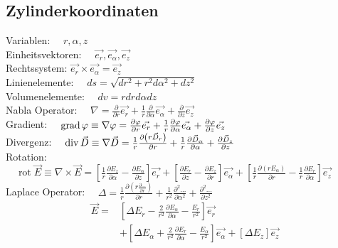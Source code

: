 \subsection{Zylinderkoordinaten}
Variablen:          $\quad r, \alpha, z$\\
Einheitsvektoren:   $\quad \vec{e_{r}}, \vec{e_{\alpha}}, \vec{e_{z}} \quad$\\
Rechtssystem: $\vec{e_{r}} \times \vec{e_{\alpha}}=\vec{e_{z}}$\\
Linienelemente:     $\quad d s=\sqrt{d r^{2}+r^{2} d \alpha^{2}+d z^{2}}$\\
Volumenelemente:    $\quad d v=r d r d \alpha d z$\\
Nabla Operator:     $\quad \nabla=\frac{\partial}{\partial r} \vec{e_{r}}+\frac{1}{r} \frac{\partial}{\partial \alpha} \vec{e_{\alpha}}+\frac{\partial}{\partial z} \vec{e_{z}}$\\
Gradient:           $\quad \operatorname{grad} \varphi \equiv \nabla \varphi=\frac{\partial \varphi}{\partial r} \vec{e_{r}}+\frac{1}{r} \frac{\partial \varphi}{\partial \alpha} \vec{e_{\alpha}}+\frac{\partial \varphi}{\partial z} \vec{e_{z}}$\\
Divergenz:          $\quad \operatorname{div} \vec{D} \equiv \nabla \vec{D}=\frac{1}{r} \frac{\partial\left(r \vec{D}_{r}\right)}{\partial r}+\frac{1}{r} \frac{\partial \vec{D}_{\alpha}}{\partial \alpha}+\frac{\partial \vec{D}_{z}}{\partial z}$\\
Rotation:           $\quad \operatorname{rot} \vec{E} \equiv \nabla \times \vec{E}=\left[\frac{1}{r} \frac{\partial E_{z}}{\partial \alpha}-\frac{\partial E_{\alpha}}{\partial z}\right] \vec{e_{r}}+\left[\frac{\partial E_{r}}{\partial z}-\frac{\partial E_{z}}{\partial r}\right] \vec{e_{\alpha}}+\left[\frac{1}{r} \frac{\partial\left(r E_{\alpha}\right)}{\partial r}-\frac{1}{r} \frac{\partial E_{r}}{\partial \alpha}\right] \vec{e_{z}}$\\
Laplace Operator:   $\quad \Delta = \frac{1}{r}\frac{\partial \left(r \frac{\partial \ldots}{\partial r}\right)}{\partial r} + \frac{1}{r^2}\frac{\partial^2 \ldots}{\partial \alpha^2} + \frac{\partial^2 \ldots}{\partial z^2}$\\
\begin{align*}
    \vec{E} = & \left[\Delta E_{r}-\frac{2}{r^{2}} \frac{\partial E_{\alpha}}{\partial \alpha}-\frac{E_{r}}{r^{2}}\right] \vec{e_{r}}                                                  \\
              & +\left[\Delta E_{\alpha}+\frac{2}{r^{2}} \frac{\partial E_{r}}{\partial \alpha}-\frac{E_{\alpha}}{r^{2}}\right] \vec{e_{\alpha}}+\left[\Delta E_{z}\right] \vec{e_{z}}
\end{align*}


